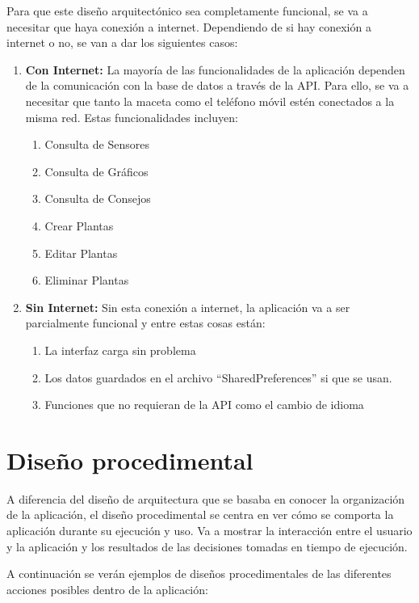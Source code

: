 Para que este diseño arquitectónico sea completamente funcional, se va a necesitar que haya conexión a internet. Dependiendo de si hay conexión a internet o no, se van a dar los siguientes casos:
\begin{enumerate}
    \item \textbf{Con Internet:}
    La mayoría de las funcionalidades de la aplicación dependen de la comunicación con la base de datos a través de la API. Para ello, se va a necesitar que tanto la maceta como el teléfono móvil estén conectados a la misma red. Estas funcionalidades incluyen:
    \begin{enumerate}
        \item {Consulta de Sensores}
        \item {Consulta de Gráficos}
        \item {Consulta de Consejos}
        \item {Crear Plantas}
        \item {Editar Plantas}
        \item {Eliminar Plantas}
    \end{enumerate}
    \item \textbf{Sin Internet:}
    Sin esta conexión a internet, la aplicación va a ser parcialmente funcional y entre estas cosas están:
    \begin{enumerate}
        \item {La interfaz carga sin problema}
        \item {Los datos guardados en el archivo ``SharedPreferences'' si que se usan.}
        \item {Funciones que no requieran de la API como el cambio de idioma}
    \end{enumerate}
\end{enumerate}


\section{Diseño procedimental}
A diferencia del diseño de arquitectura que se basaba en conocer la organización de la aplicación, el diseño procedimental se centra en ver cómo se comporta la aplicación durante su ejecución y uso. Va a mostrar la interacción entre el usuario y la aplicación y los resultados de las decisiones tomadas en tiempo de ejecución.

A continuación se verán ejemplos de diseños procedimentales de las diferentes acciones posibles dentro de la aplicación:

